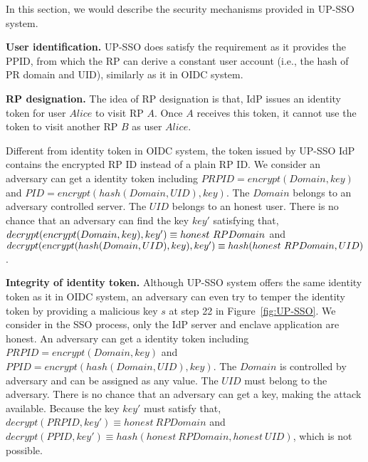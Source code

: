In this section, we would describe the security mechanisms provided in UP-SSO system. 

\vspace{3mm}\noindent\textbf{User identification.}
UP-SSO does satisfy the requirement as it provides the PPID, from which the RP can derive a constant user account (i.e., the hash of PR domain and UID), similarly as it in OIDC system. 


\vspace{3mm}\noindent\textbf{RP designation.} 
The idea of RP designation is that, IdP issues an identity token for user $Alice$ to visit RP $A$. Once $A$ receives this token, it cannot use the token to visit another RP $B$ as user $Alice$.
 
Different from identity token in OIDC system, the token issued by UP-SSO IdP contains the encrypted RP ID instead of a plain RP ID. 
We consider an adversary can get a identity token including $PRPID=encrypt(Domain, key)$ and $PID=encrypt(hash(Domain, UID), key)$. The $Domain$ belongs to an adversary controlled server. The $UID$ belongs to an honest user. 
There is no chance that an adversary can find the key $key'$ satisfying that, $decrypt(encrypt\\(Domain, key), key') \equiv honest\ RPDomain$ and  $ decrypt(encrypt(hash(Domain, \\UID), key), key')  \equiv  hash(honest\ RPDomain, UID)$.



\vspace{3mm}\noindent\textbf{Integrity of identity token.}
Although UP-SSO system offers the same identity token as it in OIDC system, an adversary can even try to temper the identity token by providing a malicious key $s$ at step 22 in Figure~\ref{fig:UP-SSO}. 
We consider in the SSO process, only the IdP server and enclave application are honest. An adversary can get a identity token including $PRPID=encrypt(Domain, key)$ and $PPID=encrypt(hash(Domain, UID), key)$. The $Domain$ is controlled by adversary and can be assigned as any value. The $UID$ must belong to the adversary. There is no chance that an adversary can get a key, making the attack available. Because the key $key'$ must satisfy that, $decrypt(PRPID, key') \equiv honest\ RPDomain$ and  $decrypt(PPID, key') \equiv  hash(honest\ RPDomain, honest\ UID)$, which is not possible.

